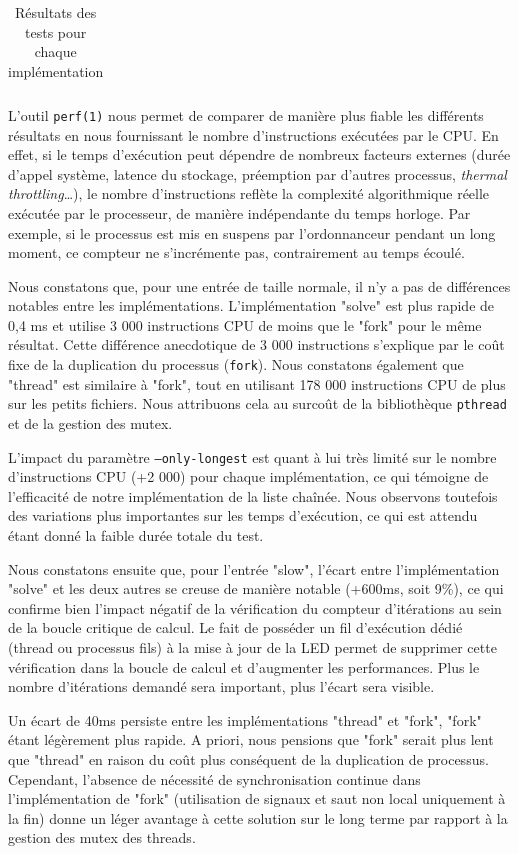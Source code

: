 \documentclass[a4paper,11pt]{article}
\begin{document}
\begin{table}[h]
{\begin{tabular}{c|rl|rl|rl|rl|}
\end{tabular}%
}
\caption{Résultats des tests pour chaque implémentation}
\label{table:resultat_implementations}
\end{table}

L'outil \texttt{perf(1)} nous permet de comparer de manière plus fiable les différents résultats en nous fournissant le nombre d'instructions exécutées par le CPU. En effet, si le temps d'exécution peut dépendre de nombreux facteurs externes (durée d'appel système, latence du stockage, préemption par d'autres processus, \textit{thermal throttling}\ldots), le nombre d'instructions reflète la complexité algorithmique réelle exécutée par le processeur, de manière indépendante du temps horloge. Par exemple, si le processus est mis en suspens par l'ordonnanceur pendant un long moment, ce compteur ne s'incrémente pas, contrairement au temps écoulé.

Nous constatons que, pour une entrée de taille normale, il n'y a pas de différences notables entre les implémentations. L'implémentation "solve" est plus rapide de 0,4 ms et utilise 3 000 instructions CPU de moins que le "fork" pour le même résultat. Cette différence anecdotique de 3 000 instructions s'explique par le coût fixe de la duplication du processus (\texttt{fork}). Nous constatons également que "thread" est similaire à "fork", tout en utilisant 178 000 instructions CPU de plus sur les petits fichiers. Nous attribuons cela au surcoût de la bibliothèque \texttt{pthread} et de la gestion des mutex.

L'impact du paramètre \texttt{--only-longest} est quant à lui très limité sur le nombre d'instructions CPU (+2 000) pour chaque implémentation, ce qui témoigne de l'efficacité de notre implémentation de la liste chaînée. Nous observons toutefois des variations plus importantes sur les temps d'exécution, ce qui est attendu étant donné la faible durée totale du test.

Nous constatons ensuite que, pour l'entrée "slow", l'écart entre l'implémentation "solve" et les deux autres se creuse de manière notable (+600ms, soit 9\%), ce qui confirme bien l'impact négatif de la vérification du compteur d'itérations au sein de la boucle critique de calcul. Le fait de posséder un fil d'exécution dédié (thread ou processus fils) à la mise à jour de la LED permet de supprimer cette vérification dans la boucle de calcul et d'augmenter les performances. Plus le nombre d'itérations demandé sera important, plus l'écart sera visible.

Un écart de 40ms persiste entre les implémentations "thread" et "fork", "fork" étant légèrement plus rapide. A priori, nous pensions que "fork" serait plus lent que "thread" en raison du coût plus conséquent de la duplication de processus. Cependant, l'absence de nécessité de synchronisation continue dans l'implémentation de "fork" (utilisation de signaux et saut non local uniquement à la fin) donne un léger avantage à cette solution sur le long terme par rapport à la gestion des mutex des threads.
\end{document}

